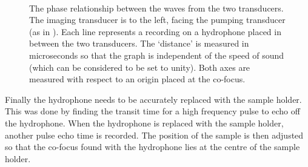 

\begin{figure}[p]%
  \centering

  \\
  \vspace{.3in}
  \caption{     %
    The phase relationship between the waves from the two transducers.
    The imaging transducer is to the left, facing the pumping transducer (as in ).
    Each line  represents a recording on a hydrophone placed in between the two transducers.
    The `distance' is measured in microseconds so that the graph is independent of the speed of sound (which can be considered to be set to unity).
    Both axes are measured with respect to an origin placed at the co-focus.}
  \label{fig:phases}
\end{figure}


Finally the hydrophone needs to be accurately replaced with the sample holder.
This was done by finding the transit time for a high frequency pulse to echo off the hydrophone.
When the hydrophone is replaced with the sample holder, another pulse echo time is recorded.
The position of the sample is then adjusted so that the co-focus found with the hydrophone lies at the centre of the  sample holder.
 



